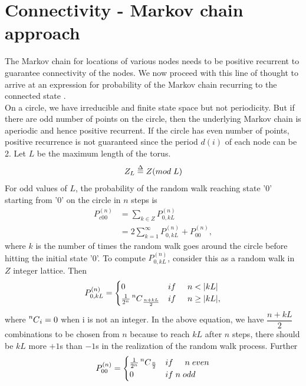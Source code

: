 \documentclass[a4paper,10pt,english]{article}
\newcommand\Mycomb[2][n]{\prescript{#1\mkern-0.5mu}{}C_{#2}}
\begin{document}
\section{Connectivity - Markov chain approach}\label{MC}
The Markov chain for locations of various nodes needs to be positive recurrent to guarantee connectivity of the nodes. We now proceed with this line of thought to arrive at an expression for probability of the Markov chain recurring to the connected state \cite{ross}.\\
On a circle, we have irreducible and finite state space but not periodicity.
But if there are odd number of points on the circle, then the underlying Markov chain is aperiodic and hence positive recurrent.
If the circle has even number of points, positive recurrence is not guaranteed since the period $d(i)$ of each node can be 2.
Let $L$ be the maximum length of the torus.
\begin{equation}
Z_L \overset{\Delta}{=} Z (mod \hspace{.1cm}L)
\end{equation}
For odd values of $L$, the probability of the random walk reaching state '0' starting from '0' on the circle in $n$ steps is 
\begin{align}
P_{c00}^{(n)} &= \sum_{k \in Z} P_{0,kL}^{(n)}\\
 &= 2 \sum_{k=1}^{\infty} P_{0, kL}^{(n)} + P_{00}^{(n)},
\end{align}
where $k$ is the number of times the random walk goes around the circle before hitting the initial state '0'. 
To compute $P_{0,kL}^{(n)}$, consider this as a random walk in $Z$ integer lattice. Then\\
\begin{equation}\label{pok}
P_{0,kL}^{(n)} =
\begin{cases}
 0  & if \hspace{.5cm}n < |kL|\\
 \frac{1}{2^n}
 \Mycomb[n]{\frac{n+kL}{2}}  & if \hspace{.5cm} n \geq |kL|,
 \end{cases}
\end{equation}
where $\Mycomb[n]{i}=0$ when i is not an integer.
In the above equation, we have $\dfrac{n+kL}{2}$ combinations to be chosen from $n$ because to reach $kL$ after $n$ steps, there should be $kL$ more $+1$s than $-1$s in the realization of the random walk process. Further\\
\begin{equation}\label{poo}
P_{00}^{(n)} =
\begin{cases}
\frac{1}{2^n} \Mycomb[n]{\frac{n}{2}} &if \hspace{0.5cm} n \hspace{0.1cm}even\\
0 \hspace{0.5cm}&if\hspace{0.1cm} n\hspace{0.1cm} odd
\end{cases}
\end{equation}
\end{document}
